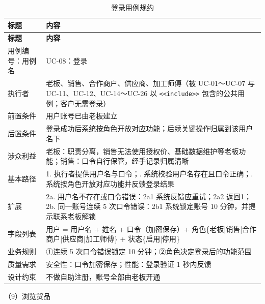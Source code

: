 \documentclass[12pt, a4paper]{ctexart}
\newcommand{\code}[1]{\texttt{\small #1}}
\begin{document}
{\small
\begin{longtable}{@{}p{2.4cm} p{12.9cm}@{}}
\caption{登录用例规约}\label{tab:uc-08}\\
\toprule
\textbf{标题} & \textbf{内容} \\
\midrule
\endfirsthead
\toprule
\textbf{标题} & \textbf{内容} \\
\midrule
\endhead
用例编号：用例名 & UC-08：登录 \\
\midrule
执行者 & 老板、销售、合作商户、供应商、加工师傅（被 UC-01～UC-07 与 UC-11、UC-12、UC-14～UC-26 以 \code{<<include>>} 包含的公共用例；客户无需登录） \\
\midrule
前置条件 & 用户账号已由老板建立 \\
\midrule
后置条件 & 登录成功后系统按角色开放对应功能；后续关键操作归属到该用户名下 \\
\midrule
涉众利益 & 老板：职责分离，销售无法使用授权价、基础数据维护等老板功能；\newline 销售：口令自行保管，经手记录归属清晰 \\
\midrule
基本路径 & 1. 执行者提供用户名与口令；\newline 2. 系统校验用户名存在且口令正确；\newline 3. 系统按角色开放对应功能并反馈登录结果 \\
\midrule
扩展 & 2a. 用户名不存在或口令错误：2a1 系统反馈应重试；2a2 返回1；\newline 2b. 同一账号连续 5 次口令错误：2b1 系统锁定账号 10 分钟，并提示联系老板解锁 \\
\midrule
字段列表 & 用户 = 用户名 + 姓名 + 口令（加密保存）+ 角色\{老板|销售|合作商户|供应商|加工师傅\} + 状态\{启用|停用\} \\
\midrule
业务规则 & ①连续 5 次口令错误锁定 10 分钟；\newline ②角色决定登录后的功能范围 \\
\midrule
质量需求 & 安全性：口令加密保存；\newline 性能：登录验证 1 秒内反馈 \\
\midrule
设计约束 & 不做自助注册，账号全部由老板开通 \\
\midrule
\bottomrule
\end{longtable}}
\noindent（9）浏览货品
\end{document}
